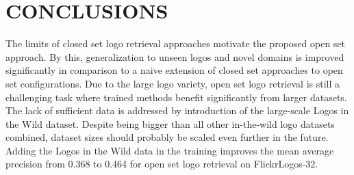 \documentclass[a4paper,twoside]{article}
\begin{document}
\section{\uppercase{Conclusions}}
\label{sec:conclusion}
\noindent The limits of closed set logo retrieval approaches motivate the proposed open set approach. By this, generalization to unseen logos and novel domains is improved significantly in comparison to a naive extension of closed set approaches to open set configurations. 
Due to the large logo variety, open set logo retrieval is still a challenging task where trained methods benefit significantly from larger datasets. The lack of sufficient data is addressed by introduction of the large-scale Logos in the Wild dataset. Despite being bigger than all other in-the-wild logo datasets combined, dataset sizes should probably be scaled even further in the future. Adding the Logos in the Wild data in the training improves the mean average precision from 0.368 to 0.464 for open set logo retrieval on FlickrLogos-32.




{\small
}

\vfill
\end{document}
